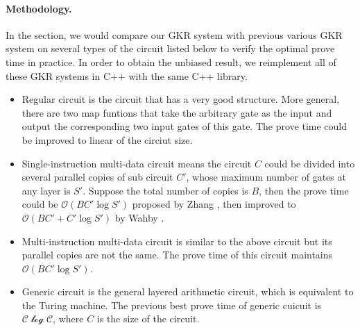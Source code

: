 \paragraph{Methodology.} In the section, we would compare our GKR system with previous various GKR system on several types of the circuit listed below to verify the optimal prove time in practice. In order to obtain the unbiased result, we reimplement all of these GKR systems in C++ with the same C++ library. 
\begin{itemize}
	\item Regular circuit is the circuit that has a very good structure. More general, there are two map funtions that take the arbitrary gate as the input and output the corresponding two input gates of this gate. The prove time could be improved to linear of the circiut size\cite{JT_Thesis}.
	\item Single-instruction multi-data circuit means the circuit $C$ could be divided into several parallel copies of sub circuit $C'$, whose maximum number of gates at any layer is $S'$. Suppose the total number of copies is $B$, then the prove time could be $\mathcal{O}(BC'\log S')$ proposed by Zhang \etal \cite{zhang2017vsql}, then improved to $\mathcal{O}(BC' + C'\log S')$ by Wahby \etal \cite{wahby2017full}.   
	\item Multi-instruction multi-data circuit is similar to the above circuit but its parallel copies are not the same. The prove time of this circuit maintains $\mathcal{O}(BC'\log S')$.
	\item Generic circuit is the general layered arithmetic circuit, which is equivalent to the Turing machine. The previous best prove time of generic cuicuit is $\mathcal{C\log C}$, where $C$ is the size of the circuit\cite{CMT}.
\end{itemize}
